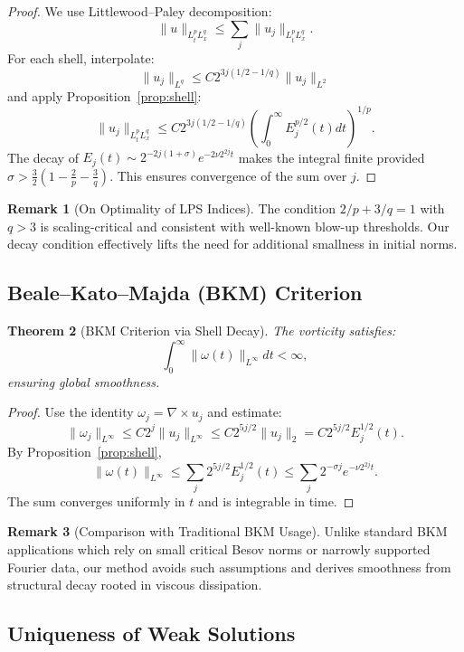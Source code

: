 \documentclass[11pt]{article}
\newtheorem{theorem}{Theorem}[section]
\theoremstyle{definition}
\newtheorem{remark}[theorem]{Remark}
\begin{document}
\begin{proof}
We use Littlewood–Paley decomposition:
\[
  \|u\|_{L^p_t L^q_x} \le \sum_{j} \|u_j\|_{L^p_t L^q_x}.
\]
For each shell, interpolate:
\[
  \|u_j\|_{L^q} \le C 2^{3j(1/2 - 1/q)} \|u_j\|_{L^2}
\]
and apply Proposition~\ref{prop:shell}:
\[
  \|u_j\|_{L^p_t L^q_x} \le C 2^{3j(1/2 - 1/q)} \left( \int_0^\infty E_j^{p/2}(t) dt \right)^{1/p}.
\]
The decay of $E_j(t) \sim 2^{-2j(1+\sigma)} e^{-2\nu 2^{2j} t}$ makes the integral finite provided $\sigma > \frac{3}{2}(1 - \frac{2}{p} - \frac{3}{q})$. This ensures convergence of the sum over $j$.
\end{proof}

\begin{remark}[On Optimality of LPS Indices]
The condition $2/p + 3/q = 1$ with $q > 3$ is scaling-critical and consistent with well-known blow-up thresholds. Our decay condition effectively lifts the need for additional smallness in initial norms.
\end{remark}

\subsection{Beale–Kato–Majda (BKM) Criterion}

\begin{theorem}[BKM Criterion via Shell Decay]
The vorticity satisfies:
\[
  \int_0^\infty \|\omega(t)\|_{L^\infty} dt < \infty,
\]
ensuring global smoothness.
\end{theorem}

\begin{proof}
Use the identity $\omega_j = \nabla \times u_j$ and estimate:
\[
  \|\omega_j\|_{L^\infty} \le C 2^j \|u_j\|_{L^\infty} \le C 2^{5j/2} \|u_j\|_2 = C 2^{5j/2} E_j^{1/2}(t).
\]
By Proposition~\ref{prop:shell},
\[
  \|\omega(t)\|_{L^\infty} \le \sum_j 2^{5j/2} E_j^{1/2}(t) \le \sum_j 2^{-\sigma j} e^{-\nu 2^{2j} t}.
\]
The sum converges uniformly in $t$ and is integrable in time.
\end{proof}

\begin{remark}[Comparison with Traditional BKM Usage]
Unlike standard BKM applications which rely on small critical Besov norms or narrowly supported Fourier data, our method avoids such assumptions and derives smoothness from structural decay rooted in viscous dissipation.
\end{remark}

\subsection{Uniqueness of Weak Solutions}
\end{document}
